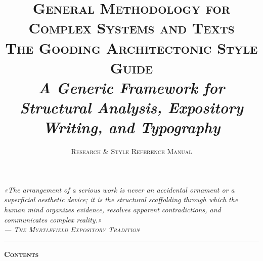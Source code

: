 \documentclass[11pt,letterpaper]{article}
\title{%
  \vspace{-1.2em}
  {\normalsize\scshape\color{myrtleSlate} General Methodology for Complex Systems and Texts}\\[0.5em]
  {\LARGE\bfseries\scshape The Gooding Architectonic Style Guide}\\[0.35em]
  {\large\itshape A Generic Framework for Structural Analysis, Expository Writing, and Typography}
}
\author{\normalsize\scshape Research \& Style Reference Manual}
\date{}
\begin{document}
\maketitle
\vspace{-1.8em}

\begin{center}
  \parbox{0.92\linewidth}{%
    \centering\itshape\small
    «The arrangement of a serious work is never an accidental ornament or a superficial aesthetic device; it is the structural scaffolding through which the human mind organizes evidence, resolves apparent contradictions, and communicates complex reality.»\\[0.3em]
    \upshape\footnotesize\scshape --- The Myrtlefield Expository Tradition
  }
\end{center}

\vspace{0.4em}
\noindent\rule{\linewidth}{0.4pt}
\vspace{0.6em}

\begin{center}
  {\Large\bfseries\scshape Contents}
\end{center}

\vspace{0.4em}
\end{document}
